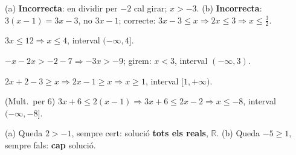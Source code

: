 \begin{solucions}
\begin{sollist}
  \item (a) \textbf{Incorrecta}: en dividir per $-2$ cal girar; $x>-3$. \quad
        (b) \textbf{Incorrecta}: $3(x-1)=3x-3$, no $3x-1$; correcte:
        $3x-3\le x \Rightarrow 2x\le 3 \Rightarrow x\le\tfrac{3}{2}$.
  \item $3x\le 12 \Rightarrow x\le 4$, interval $(-\infty,4]$.
  \item $-x-2x>-2-7 \Rightarrow -3x>-9$; girem: $x<3$, interval $(-\infty,3)$.
  \item $2x+2-3\ge x \Rightarrow 2x-1\ge x \Rightarrow x\ge 1$, interval $[1,+\infty)$.
  \item (Mult.\ per $6$) $3x+6\le 2(x-1) \Rightarrow 3x+6\le 2x-2 \Rightarrow x\le -8$,
        interval $(-\infty,-8]$.
  \item (a) Queda $2>-1$, sempre cert: solució \textbf{tots els reals}, $\mathbb{R}$. \quad
        (b) Queda $-5\ge 1$, sempre fals: \textbf{cap} solució.
\end{sollist}
\end{solucions}
